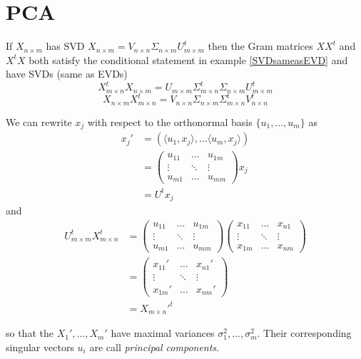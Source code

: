 \documentclass[12pt]{amsart}
\theoremstyle{definition}
\begin{document}
\section{PCA} If $X_{n \times m}$ has SVD $X_{n \times m} = V_{n \times n} \Sigma_{n \times m} U^t_{m \times m}$ then the Gram matrices $XX^t$ and $X^tX$ both satisfy the conditional statement in example \ref{SVDsameasEVD} and have SVDs (same as EVDs)
$$X^t_{m \times n} X_{n \times m} = U_{m \times m} \Sigma^t_{m \times n} \Sigma_{n \times m} U^t_{m \times m}$$
$$X_{n \times m} X^t_{m \times n} = V_{n \times n} \Sigma_{n \times m} \Sigma^t_{m \times n} V^t_{n \times n}$$

We can rewrite $x_j$ with respect to the orthonormal basis $\{u_1, \dots , u_m\}$ as
\begin{align*}
x_j' & = (\langle u_1, x_j \rangle, \dots \langle u_m, x_j \rangle) \\
 & = \left( \begin{array}{ccc} u_{11} & \dots & u_{1m} \\ \vdots & \ddots & \vdots \\ u_{m1} & \dots & u_{mm} \end{array} \right) x_j \\
 & = U^t x_j
\end{align*}
and
\begin{align*}
U_{m \times m}^t X_{m \times n}^t & =
\left(\begin{array}{ccc} u_{11} & \dots & u_{1m} \\ \vdots & \ddots & \vdots \\ u_{m1} & \dots & u_{mm} \end{array} \right)\left(\begin{array}{ccc} x_{11} & \dots & x_{n1} \\ \vdots & \ddots & \vdots \\ x_{1m} & \dots & x_{nm} \end{array} \right) \\
 & = \left(\begin{array}{ccc} x_{11}' & \dots & x_{n1}' \\ \vdots & \ddots & \vdots \\ x_{1m}' & \dots & x_{nm}' \end{array} \right) \\
 & = X_{m \times n}'^t
\end{align*}

so that the $X_1', \dots , X_m'$ have maximal variances $\sigma_1^2, \dots , \sigma_m^2$. Their corresponding singular vectors $u_i$ are call {\it principal components}.
\end{document}

